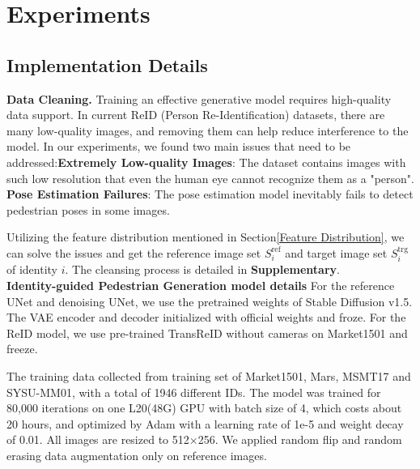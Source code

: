 \section{Experiments}
\subsection{Implementation Details}

\textbf{Data Cleaning.}
Training an effective generative model requires high-quality data support. In current ReID (Person Re-Identification) datasets, there are many low-quality images, and removing them can help reduce interference to the model. In our experiments, we found two main issues that need to be addressed:\textbf{Extremely Low-quality Images}: The dataset contains images with such low resolution that even the human eye cannot recognize them as a "person". \textbf{Pose Estimation Failures}: The pose estimation model inevitably fails to detect pedestrian poses in some images.

Utilizing the feature distribution mentioned in Section\ref{Feature Distribution}, we can solve the issues and get the reference image set $S_i^{\text{ref}}$ and target image set $S^{\text{trg}}_i$ of identity $i$.
The cleansing process is detailed in \textbf{Supplementary}. 
\\
\textbf{Identity-guided Pedestrian Generation model details}
For the reference UNet and denoising UNet, we use the pretrained weights of Stable Diffusion v1.5\cite{rombach2022high}. The VAE encoder and decoder initialized with official weights\cite{kingma2013auto} and froze. For the ReID model, we use pre-trained TransReID\cite{he2021transreid} without cameras on Market1501 and freeze. 

The training data collected from training set of Market1501\cite{zheng2015scalable},  Mars\cite{zheng2016mars}, MSMT17\cite{wei2018person} and SYSU-MM01\cite{wu2017rgb}, with a total of 1946 different IDs. The model was trained for 80,000 iterations on one L20(48G) GPU with batch size of 4, which costs about 20 hours, and optimized by Adam\cite{kingma2014adam} with a learning rate of 1e-5 and weight decay of 0.01. All images are resized to 512×256. We applied random flip and random erasing\cite{zhong2020random} data augmentation only on reference images.

